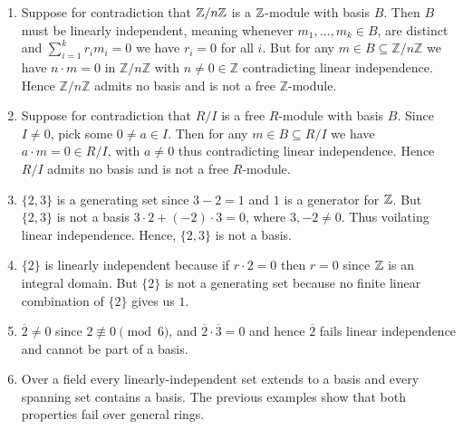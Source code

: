 \documentclass[Notebook.tex]{subfiles}
\begin{document}
    \begin{solution}
        \bbni
        \begin{enumerate}
            \item Suppose for contradiction that $\mathbb Z/n\mathbb Z$ is a $\mathbb Z$-module with basis $B$. Then $B$ must be linearly independent, meaning whenever $m_1, \ldots, m_k \in B$, are distinct and $\sum_{i=1}^k r_i m_i = 0$ we have $r_i = 0$ for all $i$. But for any $m \in B \subseteq \mathbb{Z}/n\mathbb{Z}$ we have $n \cdot m = 0$ in $\mathbb{Z}/n\mathbb{Z}$ with $n \neq 0 \in \mathbb{Z}$ contradicting linear independence. Hence $\mathbb{Z}/n\mathbb{Z}$ admits no basis and is not a free $\mathbb{Z}$-module.
            
            \item  Suppose for contradiction that $R/I$ is a free $R$-module with basis $B$. Since $I \neq 0$, pick some $0 \neq a \in I$. Then for any $m \in B \subseteq R/I$ we have $ a \cdot m = 0 \in R/I$, with $a \neq 0$ thus contradicting linear independence. Hence $R/I$ admits no basis and is not a free $R$-module.
            
            \item $\{2, 3\}$ is a generating set since $3-2 = 1$ and $1$ is a generator for $\mathbb Z$. But $\{2, 3\}$ is not a basis $3 \cdot 2 + (-2) \cdot 3 = 0$, where $3, -2 \neq 0$. Thus voilating linear independence. Hence, $\{2, 3\}$ is not a basis.
            
            \item $\{2\}$ is linearly independent because if $r \cdot 2 = 0$ then $r = 0$ since $\mathbb Z$ is an integral domain. But $\{2\}$ is not a generating set because no finite linear combination of $\{2\}$ gives us $1$. 
            
            \item $\overline{2} \neq 0$ since $2 \not \equiv 0 \pmod 6$, and $\overline{2} \cdot \overline{3} = 0$ and hence $\overline{2}$ fails linear independence and cannot be part of a basis. 
            
            \item Over a field every linearly-independent set extends to a basis and every spanning set contains a basis. The previous examples show that both properties fail over general rings. 
        \end{enumerate}
    \end{solution}

    \newpage 
\end{document}
